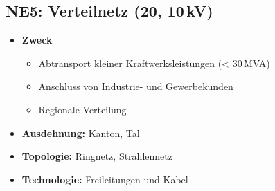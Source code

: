 \subsection{NE5: Verteilnetz (20, 10\,kV)}
    \begin{minipage}[t]{0.5\columnwidth}
        \begin{itemize}
            \item \textbf{Zweck}
            \begin{itemize}
                \item Abtransport kleiner Kraftwerksleistungen (< 30\,MVA)
                \item Anschluss von Industrie- und Gewerbekunden
                \item Regionale Verteilung
            \end{itemize}
        \end{itemize}
    \end{minipage}%
    \hfill
    \begin{minipage}[t]{0.49\columnwidth}
        \begin{itemize}
            \item \textbf{Ausdehnung:} Kanton, Tal
            \item \textbf{Topologie:} Ringnetz, Strahlennetz
            \item \textbf{Technologie:} Freileitungen und Kabel
        \end{itemize}
    \end{minipage}

